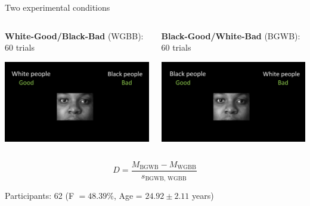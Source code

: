 \documentclass[compress]{beamer}
\begin{document}
\begin{frame}

\begin{block}{Two experimental conditions}
	\begin{columns}[T]
		\begin{column}{.50\linewidth}
			\begin{center}
				\textbf{White-Good/Black-Bad} (WGBB): 60 trials
			\end{center}
			
			\centering \includegraphics[width=\linewidth]{img/wgbb.png}
		\end{column}
		
		\begin{column}{.50\linewidth}
			\begin{center}
				\textbf{Black-Good/White-Bad} (BGWB):   60 trials
			\end{center}
			
			\centering \includegraphics[width=\linewidth]{img/bgwb.png}
		\end{column}
	\end{columns}
\end{block}

\begin{equation*}
	D = \dfrac{M_{\text{BGWB}}-M_{\text{WGBB}}}{s_{\text{BGWB, WGBB}}}
\end{equation*}

	\vspace{1.2mm}
Participants: 62 (F $=48.39$\%, Age = $24.92\pm2.11$ years)
\end{frame}
\end{document}
